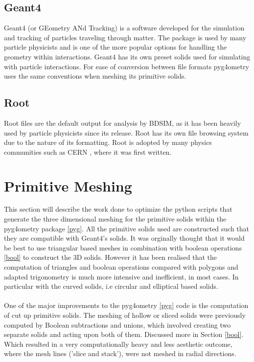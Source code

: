 \documentclass[12pt,a4paper]{article}
\begin{document}
\subsection{Geant4}\label{geant4}
\label{g4}
Geant4 (or GEometry ANd Tracking) is a software developed for the simulation and tracking of particles traveling through matter. The package is used by many particle physicists and is one of the more popular options for handling the geometry within interactions. Geant4 has its own preset solids used for simulating with particle interactions. For ease of conversion between file formats pyg4ometry uses the same conventions when meshing its primitive solids.

\subsection{Root}\label{root}
Root files are the default output for analysis by BDSIM, as it has been heavily used by particle physicists since its release. Root has its own file browsing system due to the nature of its formatting. Root is adopted by many physics communities such as CERN \cite{cern}, where it was first written.


\newpage
\section{Primitive Meshing}
\label{prim}
This section will describe the work done to optimize the python scripts that generate the three dimensional meshing for the primitive solids within the pyg4ometry package \ref{pyg}. All the primitive solids used are constructed such that they are compatible with Geant4's solids. It was orginally thought that it would be best to use triangular based meshes in combination with boolean operations \ref{bool} to construct the 3D solids. However it has been realised that the computation of triangles and boolean operations compared with polygons and adapted trigonometry is much more intensive and inefficient, in most cases. In particular with the curved solids, i.e circular and elliptical based solids.
\\\\
One of the major improvements to the pyg4ometry \ref{pyg} code is the computation of cut up primitive solids. The meshing of hollow or sliced solids were previously computed by Boolean subtractions and unions, which involved creating two separate solids and acting upon both of them. Discussed more in Section \ref{bool}. Which resulted in a very computationally heavy and less aesthetic outcome, where the mesh lines ('slice and stack'), were not meshed in radial directions.
\end{document}
